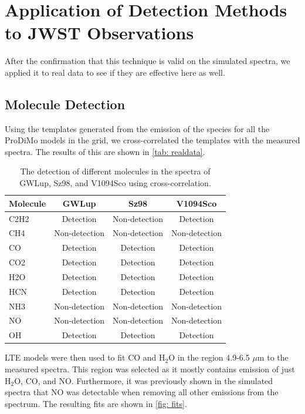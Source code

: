 \documentclass[twoside, single, authoryear, semicolon, 12pt]{lion-msc}
\newcommand{\4}{$_4$}
\newcommand{\3}{$_3$}
\newcommand{\2}{$_2$}
\begin{document}
\section{Application of Detection Methods to JWST Observations}
After the confirmation that this technique is valid on the simulated spectra, we applied it to real data to see if they are effective here as well.

\subsection{Molecule Detection}
Using the templates generated from the emission of the species for all the ProDiMo models in the grid, we cross-correlated the templates with the measured spectra. The results of this are shown in \autoref{tab: realdata}.

\begin{table}[!ht]
\centering
\begin{tabular}{|l|ccc|}
\hline
\textbf{Molecule} & \textbf{GWLup} & \textbf{Sz98} & \textbf{V1094Sco} \\ \hline
C2H2            & Detection      & Non-detection & Detection         \\
CH4             & Non-detection  & Non-detection & Non-detection     \\
CO              & Detection      & Detection     & Detection         \\
CO2             & Detection      & Detection     & Detection         \\
H2O             & Detection      & Detection     & Detection         \\
HCN             & Detection      & Detection     & Detection         \\
NH3             & Non-detection  & Non-detection & Non-detection     \\
NO              & Non-detection  & Non-detection & Non-detection     \\
OH              & Detection      & Detection     & Detection         \\ \hline
\end{tabular}

\caption{The detection of different molecules in the spectra of GWLup, Sz98, and V1094Sco using cross-correlation.}
\label{tab: realdata}
\end{table}


LTE models were then used to fit CO and H\2O in the region 4.9-6.5 $\mu$m to the measured spectra. This region was selected as it mostly contains emission of just H\2O, CO, and NO. Furthermore, it was previously shown in the simulated spectra that NO was detectable when removing all other emissions from the spectrum. The resulting fits are shown in \autoref{fig: fits}.
\end{document}
